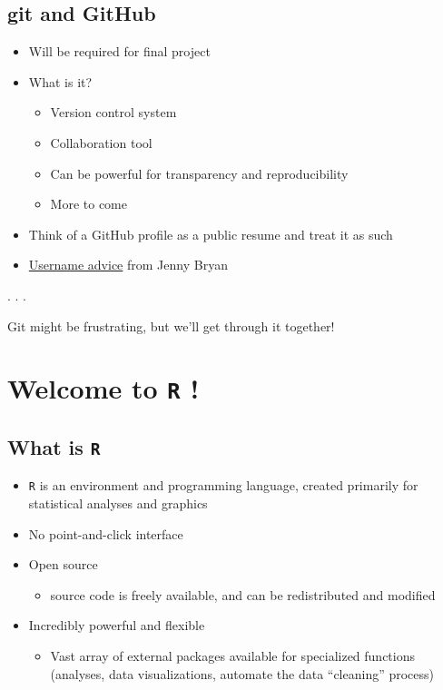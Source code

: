 \documentclass[
  letterpaper,
  DIV=11,
  numbers=noendperiod,
  oneside]{scrartcl}
\providecommand{\tightlist}{%
  \setlength{\itemsep}{0pt}\setlength{\parskip}{0pt}}\usepackage{longtable,booktabs,array}
\begin{document}
\hypertarget{git-and-github}{%
\subsection{git and GitHub}\label{git-and-github}}

\begin{itemize}
\tightlist
\item
  Will be required for final project
\item
  What is it?

  \begin{itemize}
  \tightlist
  \item
    Version control system
  \item
    Collaboration tool
  \item
    Can be powerful for transparency and reproducibility
  \item
    More to come
  \end{itemize}
\item
  Think of a GitHub profile as a public resume and treat it as such
\item
  \href{https://happygitwithr.com/github-acct.html}{Username advice}
  from Jenny Bryan
\end{itemize}

. . .

Git might be frustrating, but we'll get through it together!

\hypertarget{welcome-to-r}{%
\section{\texorpdfstring{Welcome to \texttt{R}
!}{Welcome to R !}}\label{welcome-to-r}}

\hypertarget{what-is-r}{%
\subsection{\texorpdfstring{What is
\texttt{R}}{What is R}}\label{what-is-r}}

\begin{itemize}
\tightlist
\item
  \texttt{R} is an environment and programming language, created
  primarily for statistical analyses and graphics
\item
  No point-and-click interface
\item
  Open source

  \begin{itemize}
  \tightlist
  \item
    source code is freely available, and can be redistributed and
    modified
  \end{itemize}
\item
  Incredibly powerful and flexible

  \begin{itemize}
  \tightlist
  \item
    Vast array of external packages available for specialized functions
    (analyses, data visualizations, automate the data ``cleaning''
    process)
  \end{itemize}
\end{itemize}
\end{document}
